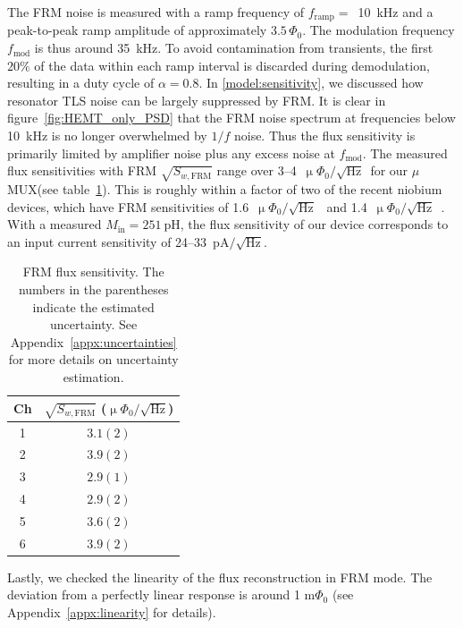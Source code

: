 \documentclass[
 prd,
 reprint,
 superscriptaddress,
 amsmath,amssymb,
 aps,
 floatfix,
]{revtex4-2}
\newcommand{\uMUX}{$\mu$MUX\xspace}
\newcommand{\uPhirtHz}{$\upmu \Phi_0/\sqrt{\text{Hz}}$\xspace}
\begin{document}
The FRM noise is measured with a ramp frequency of $f_{\mathrm{ramp}} = $~\qty{10}{\kHz} and a peak-to-peak ramp amplitude of approximately $3.5\,\Phi_0$. The modulation frequency $f_{\text{mod}}$ is thus around \qty{35}{kHz}. To avoid contamination from transients, the first $20\%$ of the data within each ramp interval is discarded during demodulation, resulting in a duty cycle of \mbox{$\alpha = 0.8$}. In \cref{model:sensitivity}, we discussed how resonator TLS noise can be largely suppressed by FRM. It is clear in figure~\ref{fig:HEMT_only_PSD} that the FRM noise spectrum at frequencies below \qty{10}{\kHz} is no longer overwhelmed by $1/f$ noise. Thus the flux sensitivity is primarily limited by amplifier noise plus any excess noise at $f_{\text{mod}}$. The measured flux sensitivities with FRM $\sqrt{S_{w, \text{FRM}}}$ range over 3--4~\uPhirtHz~for our \uMUX (see table~\ref{tab:FRM_noise}). This is roughly within a factor of two of the recent niobium devices, which have FRM sensitivities of 1.6~\uPhirtHz~\cite{malnou_improved_2023} and 1.4~\uPhirtHz~\cite{neidig_full-scale_2025}. With a measured $M_{\mathrm{in}} = 251~\mathrm{pH}$, the flux sensitivity of our device corresponds to an input current sensitivity of 24--33~$\mathrm{pA}/\sqrt{\mathrm{Hz}}$.

\begin{table}[htb]
    \centering
    \begin{tabular}{c c}
    \hline
         \small{Ch} & \small{$\sqrt{S_{w, \text{FRM}}}$ (\uPhirtHz)}\\
    \hline
    1 & $3.1 (2)$\\
    2 & $3.9 (2)$\\
    3 & $2.9 (1)$\\
    4 & $2.9 (2)$\\
    5 & $3.6 (2)$\\
    6 & $3.9 (2)$\\
    \hline
    \end{tabular}
    \caption{FRM flux sensitivity. The numbers in the parentheses indicate the estimated uncertainty. See Appendix~\ref{appx:uncertainties} for more details on uncertainty estimation.}
    \label{tab:FRM_noise}
\end{table}

Lastly, we checked the linearity of the flux reconstruction in FRM mode. The deviation from a perfectly linear response is around 1 $\mathrm{m}\Phi_0$ (see Appendix~\ref{appx:linearity} for details).


\end{document}
